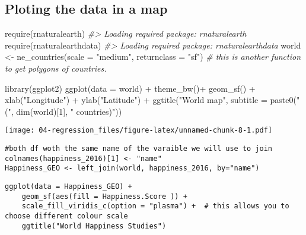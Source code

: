 \documentclass[
]{book}
\newenvironment{Shaded}{\begin{snugshade}}{\end{snugshade}}
\newcommand{\AttributeTok}[1]{\textcolor[rgb]{0.77,0.63,0.00}{#1}}
\newcommand{\CommentTok}[1]{\textcolor[rgb]{0.56,0.35,0.01}{\textit{#1}}}
\newcommand{\DecValTok}[1]{\textcolor[rgb]{0.00,0.00,0.81}{#1}}
\newcommand{\FunctionTok}[1]{\textcolor[rgb]{0.00,0.00,0.00}{#1}}
\newcommand{\NormalTok}[1]{#1}
\newcommand{\OtherTok}[1]{\textcolor[rgb]{0.56,0.35,0.01}{#1}}
\newcommand{\SpecialCharTok}[1]{\textcolor[rgb]{0.00,0.00,0.00}{#1}}
\newcommand{\StringTok}[1]{\textcolor[rgb]{0.31,0.60,0.02}{#1}}
\theoremstyle{definition}
\theoremstyle{definition}
\theoremstyle{definition}
\theoremstyle{definition}
\theoremstyle{remark}
\begin{document}
\hypertarget{ploting-the-data-in-a-map}{%
\subsection{Ploting the data in a map}\label{ploting-the-data-in-a-map}}

\begin{Shaded}
\begin{Highlighting}[]
\FunctionTok{require}\NormalTok{(rnaturalearth)}
\CommentTok{\#\textgreater{} Loading required package: rnaturalearth}
\FunctionTok{require}\NormalTok{(rnaturalearthdata)}
\CommentTok{\#\textgreater{} Loading required package: rnaturalearthdata}
\NormalTok{world }\OtherTok{\textless{}{-}} \FunctionTok{ne\_countries}\NormalTok{(}\AttributeTok{scale =} \StringTok{"medium"}\NormalTok{, }\AttributeTok{returnclass =} \StringTok{"sf"}\NormalTok{) }\CommentTok{\# this is another function to get polygons of countries. }
\end{Highlighting}
\end{Shaded}

\begin{Shaded}
\begin{Highlighting}[]
\FunctionTok{library}\NormalTok{(ggplot2)}
\FunctionTok{ggplot}\NormalTok{(}\AttributeTok{data =}\NormalTok{ world) }\SpecialCharTok{+}
    \FunctionTok{theme\_bw}\NormalTok{()}\SpecialCharTok{+} 
    \FunctionTok{geom\_sf}\NormalTok{() }\SpecialCharTok{+} 
    \FunctionTok{xlab}\NormalTok{(}\StringTok{"Longitude"}\NormalTok{) }\SpecialCharTok{+} \FunctionTok{ylab}\NormalTok{(}\StringTok{"Latitude"}\NormalTok{) }\SpecialCharTok{+} 
    \FunctionTok{ggtitle}\NormalTok{(}\StringTok{"World map"}\NormalTok{, }\AttributeTok{subtitle =} \FunctionTok{paste0}\NormalTok{(}\StringTok{"("}\NormalTok{, }\FunctionTok{dim}\NormalTok{(world)[}\DecValTok{1}\NormalTok{], }\StringTok{" countries)"}\NormalTok{))}
\end{Highlighting}
\end{Shaded}

\texttt{[image: 04-regression\_files/figure-latex/unnamed-chunk-8-1.pdf]}

\begin{verbatim}
#both df woth the same name of the varaible we will use to join
colnames(happiness_2016)[1] <- "name"
Happiness_GEO <- left_join(world, happiness_2016, by="name")
\end{verbatim}

\begin{verbatim}
ggplot(data = Happiness_GEO) +
    geom_sf(aes(fill = Happiness.Score )) +
    scale_fill_viridis_c(option = "plasma") +  # this allows you to choose different colour scale
    ggtitle("World Happiness Studies")
\end{verbatim}
\end{document}
